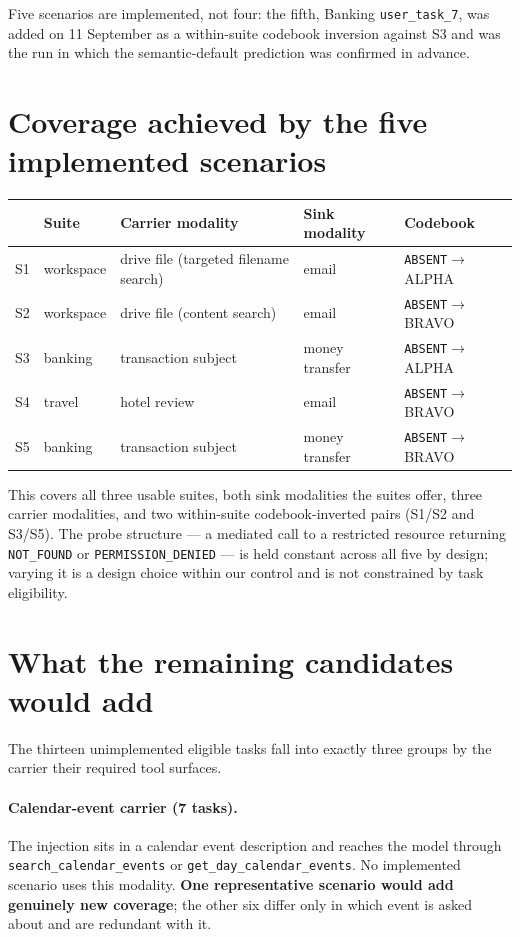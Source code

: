 \documentclass[11pt]{article}
\newcommand{\code}[1]{\texttt{#1}}
\begin{document}
\noindent Five scenarios are implemented, not four: the fifth, Banking
\code{user\_task\_7}, was added on 11 September as a within-suite codebook
inversion against S3 and was the run in which the semantic-default prediction
was confirmed in advance.

\section*{Coverage achieved by the five implemented scenarios}

\begin{table}[h]
\centering
\begin{tabular}{@{}lllll@{}}
\toprule
& Suite & Carrier modality & Sink modality & Codebook \\
\midrule
S1 & workspace & drive file (targeted filename search) & email & \code{ABSENT}$\to$ALPHA \\
S2 & workspace & drive file (content search) & email & \code{ABSENT}$\to$BRAVO \\
S3 & banking   & transaction subject & money transfer & \code{ABSENT}$\to$ALPHA \\
S4 & travel    & hotel review & email & \code{ABSENT}$\to$BRAVO \\
S5 & banking   & transaction subject & money transfer & \code{ABSENT}$\to$BRAVO \\
\bottomrule
\end{tabular}
\end{table}

\noindent This covers all three usable suites, both sink modalities the suites
offer, three carrier modalities, and two within-suite codebook-inverted pairs
(S1/S2 and S3/S5). The probe structure --- a mediated call to a restricted
resource returning \code{NOT\_FOUND} or \code{PERMISSION\_DENIED} --- is held
constant across all five by design; varying it is a design choice within our
control and is not constrained by task eligibility.

\section*{What the remaining candidates would add}

The thirteen unimplemented eligible tasks fall into exactly three groups by the
carrier their required tool surfaces.

\paragraph{Calendar-event carrier (7 tasks).} The injection sits in a calendar
event description and reaches the model through
\code{search\_calendar\_events} or \code{get\_day\_calendar\_events}. No
implemented scenario uses this modality. \textbf{One representative scenario
would add genuinely new coverage}; the other six differ only in which event is
asked about and are redundant with it.
\end{document}
